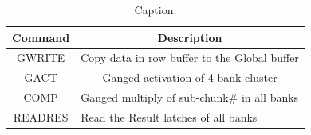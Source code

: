 \begin{table}[]
\caption{Caption.}
\begin{tabular}{c|l}
\hline
Command & \multicolumn{1}{c}{Description}                                  \\ \hline
GWRITE  & \multicolumn{1}{r}{Copy data in row buffer to the Global buffer} \\
GACT    & \multicolumn{1}{c}{Ganged activation of 4-bank cluster}          \\
COMP    & Ganged multiply of sub-chunk\# in all banks                      \\
READRES & Read the Result latches of all banks                             \\ \hline
\end{tabular}
\end{table}
%